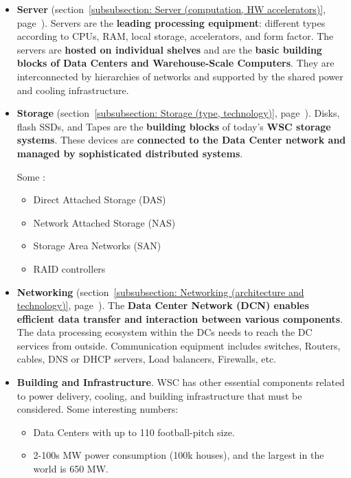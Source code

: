 \begin{itemize}
    \item \textbf{Server} (section~\ref{subsubsection: Server (computation, HW accelerators)}, page~\pageref{subsubsection: Server (computation, HW accelerators)}). Servers are the \textbf{leading processing equipment}: different types according to CPUs, RAM, local storage, accelerators, and form factor. The servers are \textbf{hosted on individual shelves} and are the \textbf{basic building blocks of Data Centers and Warehouse-Scale Computers}. They are interconnected by hierarchies of networks and supported by the shared power and cooling infrastructure.

    \item \textbf{Storage} (section~\ref{subsubsection: Storage (type, technology)}, page~\pageref{subsubsection: Storage (type, technology)}). Disks, flash SSDs, and Tapes are the \textbf{building blocks} of today's \textbf{WSC storage systems}. These devices are \textbf{connected to the Data Center network and managed by sophisticated distributed systems}.
    
    Some :
    \begin{itemize}
        \item Direct Attached Storage (DAS)

        \item Network Attached Storage (NAS)

        \item Storage Area Networks (SAN)

        \item RAID controllers
    \end{itemize}

    \item \textbf{Networking} (section~\ref{subsubsection: Networking (architecture and technology)}, page~\pageref{subsubsection: Networking (architecture and technology)}). The \textbf{Data Center Network (DCN) enables efficient data transfer and interaction between various components}. The data processing ecosystem within the DCs needs to reach the DC services from outside.
    Communication equipment includes switches, Routers, cables, DNS or DHCP servers, Load balancers, Firewalls, etc.

    \item \textbf{Building and Infrastructure}. WSC has other essential components related to power delivery, cooling, and building infrastructure that must be considered. Some interesting numbers:
    \begin{itemize}
        \item Data Centers with up to 110 football-pitch size.
        
        \item 2-100s MW power consumption (100k houses), and the largest in the world is 650 MW.
    \end{itemize}
\end{itemize}